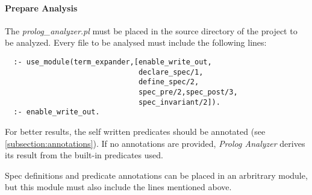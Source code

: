 \documentclass[a4paper]{article}
\newcommand{\prologPart}{\textit{prolog\_analyzer.pl}}
\newcommand{\prologAnalyzer}{\textit{Prolog Analyzer}}
\begin{document}
\paragraph{Prepare Analysis}
The \prologPart{} must be placed in the source directory of the project to be
analyzed. Every file to be analysed must include the following lines:
\begin{lstlisting}
  :- use_module(term_expander,[enable_write_out,
                               declare_spec/1,
                               define_spec/2,
                               spec_pre/2,spec_post/3,
                               spec_invariant/2]).
  :- enable_write_out.
\end{lstlisting}

For better results, the self written predicates should be annotated (see
\ref{subsection:annotations}). If no annotations are provided, \prologAnalyzer{}
derives its result from the built-in predicates used.


Spec definitions and predicate annotations can be placed in an arbritrary
module, but this module must also include the lines mentioned above.
\end{document}
